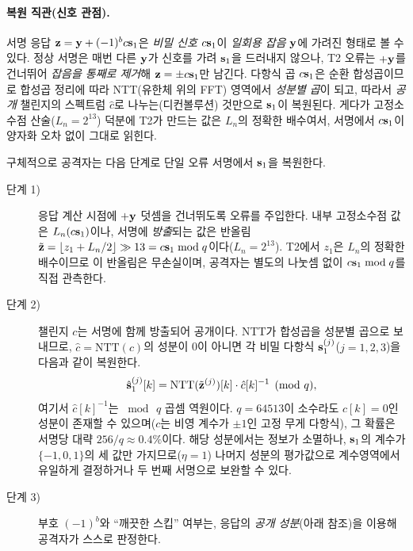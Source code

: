\paragraph{복원 직관(신호 관점).} 서명 응답 $\mathbf{z}=\mathbf{y}+(-1)^b c\mathbf{s}_1$은 \emph{비밀 신호} $c\mathbf{s}_1$이
\emph{일회용 잡음} $\mathbf{y}$에 가려진 형태로 볼 수 있다. 정상 서명은 매번 다른 $\mathbf{y}$가 신호를 가려
$\mathbf{s}_1$을 드러내지 않으나, T2 오류는 $+\mathbf{y}$를 건너뛰어 \emph{잡음을 통째로 제거}해 $\mathbf{z}=\pm c\mathbf{s}_1$만
남긴다. 다항식 곱 $c\mathbf{s}_1$은 순환 합성곱이므로 합성곱 정리에 따라 NTT(유한체 위의 FFT) 영역에서
\emph{성분별 곱}이 되고, 따라서 \emph{공개} 챌린지의 스펙트럼 $\hat c$로 나누는(디컨볼루션) 것만으로
$\mathbf{s}_1$이 복원된다. 게다가 고정소수점 산술($L_n=2^{13}$) 덕분에 T2가 만드는 값은 $L_n$의 정확한
배수여서, 서명에서 $c\mathbf{s}_1$이 양자화 오차 없이 그대로 읽힌다.

구체적으로 공격자는 다음 단계로 단일 오류 서명에서 $\mathbf{s}_1$을 복원한다.
\begin{description}
  \item[단계 1)] 응답 계산 시점에 $+\mathbf{y}$ 덧셈을 건너뛰도록 오류를 주입한다. 내부 고정소수점 값은
        $L_n(c\mathbf{s}_1)$이나, 서명에 \emph{방출}되는 값은 반올림 $\tilde{\mathbf{z}}=\lfloor z_1+L_n/2\rfloor\gg13
        = c\mathbf{s}_1\bmod q$이다($L_n=2^{13}$). T2에서 $z_1$은 $L_n$의 정확한 배수이므로 이 반올림은
        무손실이며, 공격자는 별도의 나눗셈 없이 $c\mathbf{s}_1\bmod q$를 직접 관측한다.
  \item[단계 2)] 챌린지 $c$는 서명에 함께 방출되어 공개이다. NTT가 합성곱을 성분별 곱으로 보내므로,
        $\hat c=\mathrm{NTT}(c)$의 성분이 0이 아니면 각 비밀 다항식 $\mathbf{s}_1^{(j)}$($j=1,2,3$)을
        다음과 같이 복원한다.
        \begin{equation}
          \hat{\mathbf{s}}_1^{(j)}[k]=\mathrm{NTT}(\tilde{\mathbf{z}}^{(j)})[k]\cdot \hat c[k]^{-1}\pmod q,
          \label{eq:t2recover}
        \end{equation}
        여기서 $\hat c[k]^{-1}$는 $\bmod\,q$ 곱셈 역원이다. $q=64513$이 소수라도 $\hat c[k]=0$인 성분이
        존재할 수 있으며($c$는 비영 계수가 $\pm1$인 고정 무게 다항식), 그 확률은 서명당 대략 $256/q\approx0.4\%$이다.
        해당 성분에서는 정보가 소멸하나, $\mathbf{s}_1$의 계수가 $\{-1,0,1\}$의 세 값만 가지므로($\eta=1$) 나머지
        성분의 평가값으로 계수영역에서 유일하게 결정하거나 두 번째 서명으로 보완할 수 있다.
  \item[단계 3)] 부호 $(-1)^b$와 ``깨끗한 스킵'' 여부는, 응답의 \emph{공개 성분}(아래 참조)을 이용해
        공격자가 스스로 판정한다.
\end{description}

